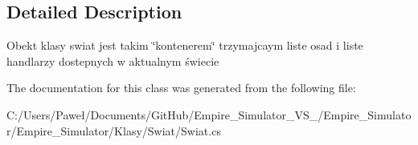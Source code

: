 \subsection{Detailed Description}
Obekt klasy swiat jest takim \char`\"{}kontenerem\char`\"{} trzymajcaym liste osad i liste handlarzy dostepnych w aktualnym świecie 



The documentation for this class was generated from the following file\+:\begin{DoxyCompactItemize}
\item 
C\+:/\+Users/\+Paweł/\+Documents/\+Git\+Hub/\+Empire\+\_\+\+Simulator\+\_\+\+V\+S\+\_/\+Empire\+\_\+\+Simulator/\+Empire\+\_\+\+Simulator/\+Klasy/\+Swiat/Swiat.\+cs\end{DoxyCompactItemize}
